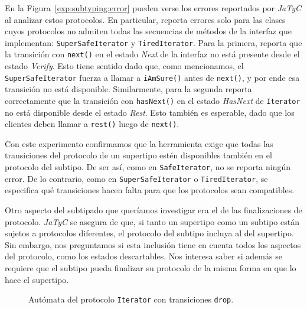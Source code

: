 En la Figura~\ref{exp:subtyping:error} pueden verse los errores reportados por \textit{JaTyC} al analizar estos protocolos. En particular, reporta errores solo para las clases cuyos protocolos no admiten todas las secuencias de métodos de la interfaz que implementan: \texttt{SuperSafeIterator} y \texttt{TiredIterator}. Para la primera, reporta que la transición con \texttt{next()} en el estado \textit{Next} de la interfaz no está presente desde el estado \textit{Verify}. Esto tiene sentido dado que, como mencionamos, el \texttt{SuperSafeIterator} fuerza a llamar a \texttt{iAmSure()} antes de \texttt{next()}, y por ende esa transición no está disponible. Similarmente, para la segunda reporta correctamente que la transición con \texttt{hasNext()} en el estado \textit{HasNext} de \texttt{Iterator} no está disponible desde el estado \textit{Rest}. Esto también es esperable, dado que los clientes deben llamar a \texttt{rest()} luego de \texttt{next()}.

Con este experimento confirmamos que la herramienta exige que todas las transiciones del protocolo de un supertipo estén disponibles también en el protocolo del subtipo. De ser así, como en \texttt{SafeIterator}, no se reporta ningún error. De lo contrario, como en \texttt{SuperSafeIterator} o \texttt{TiredIterator}, se especifica qué transiciones hacen falta para que los protocolos sean compatibles.

Otro aspecto del subtipado que queríamos investigar era el de las finalizaciones de protocolo. \textit{JaTyC} se asegura de que, si tanto un supertipo como un subtipo están sujetos a protocolos diferentes, el protocolo del subtipo incluya al del supertipo. Sin embargo, nos preguntamos si esta inclusión tiene en cuenta todos los aspectos del protocolo, como los estados descartables. Nos interesa saber si además se requiere que el subtipo pueda finalizar su protocolo de la misma forma en que lo hace el supertipo.

\begin{figure}[htbp]
\centering
{}
\caption{Autómata del protocolo \texttt{Iterator} con transiciones \texttt{drop}.}
\label{exp:droppable_iterator_protocol}
\end{figure}

